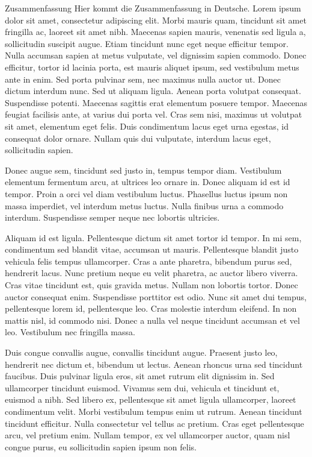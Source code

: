 \begin{coverpage}{Zusammenfassung}
Hier kommt die Zusammenfassung in Deutsche. Lorem ipsum dolor sit amet, consectetur adipiscing elit. Morbi mauris quam, tincidunt sit amet fringilla ac, laoreet sit amet nibh. Maecenas sapien mauris, venenatis sed ligula a, sollicitudin suscipit augue. Etiam tincidunt nunc eget neque efficitur tempor. Nulla accumsan sapien at metus vulputate, vel dignissim sapien commodo. Donec efficitur, tortor id lacinia porta, est mauris aliquet ipsum, sed vestibulum metus ante in enim. Sed porta pulvinar sem, nec maximus nulla auctor ut. Donec dictum interdum nunc. Sed ut aliquam ligula. Aenean porta volutpat consequat. Suspendisse potenti. Maecenas sagittis erat elementum posuere tempor. Maecenas feugiat facilisis ante, at varius dui porta vel. Cras sem nisi, maximus ut volutpat sit amet, elementum eget felis. Duis condimentum lacus eget urna egestas, id consequat dolor ornare. Nullam quis dui vulputate, interdum lacus eget, sollicitudin sapien.

Donec augue sem, tincidunt sed justo in, tempus tempor diam. Vestibulum elementum fermentum arcu, at ultrices leo ornare in. Donec aliquam id est id tempor. Proin a orci vel diam vestibulum luctus. Phasellus luctus ipsum non massa imperdiet, vel interdum metus luctus. Nulla finibus urna a commodo interdum. Suspendisse semper neque nec lobortis ultricies.

Aliquam id est ligula. Pellentesque dictum sit amet tortor id tempor. In mi sem, condimentum sed blandit vitae, accumsan ut mauris. Pellentesque blandit justo vehicula felis tempus ullamcorper. Cras a ante pharetra, bibendum purus sed, hendrerit lacus. Nunc pretium neque eu velit pharetra, ac auctor libero viverra. Cras vitae tincidunt est, quis gravida metus. Nullam non lobortis tortor. Donec auctor consequat enim. Suspendisse porttitor est odio. Nunc sit amet dui tempus, pellentesque lorem id, pellentesque leo. Cras molestie interdum eleifend. In non mattis nisl, id commodo nisi. Donec a nulla vel neque tincidunt accumsan et vel leo. Vestibulum nec fringilla massa.

Duis congue convallis augue, convallis tincidunt augue. Praesent justo leo, hendrerit nec dictum et, bibendum ut lectus. Aenean rhoncus urna sed tincidunt faucibus. Duis pulvinar ligula eros, sit amet rutrum elit dignissim in. Sed ullamcorper tincidunt euismod. Vivamus sem dui, vehicula et tincidunt et, euismod a nibh. Sed libero ex, pellentesque sit amet ligula ullamcorper, laoreet condimentum velit. Morbi vestibulum tempus enim ut rutrum. Aenean tincidunt tincidunt efficitur. Nulla consectetur vel tellus ac pretium. Cras eget pellentesque arcu, vel pretium enim. Nullam tempor, ex vel ullamcorper auctor, quam nisl congue purus, eu sollicitudin sapien ipsum non felis.


\end{coverpage}
